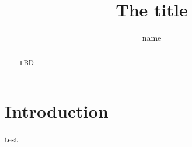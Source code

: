 \documentclass{article}
\title{The title}
\author{name}
\begin{document}
\maketitle

\begin{abstract}
TBD
\end{abstract}

\section{Introduction}

test

% 
% 
\end{document}
